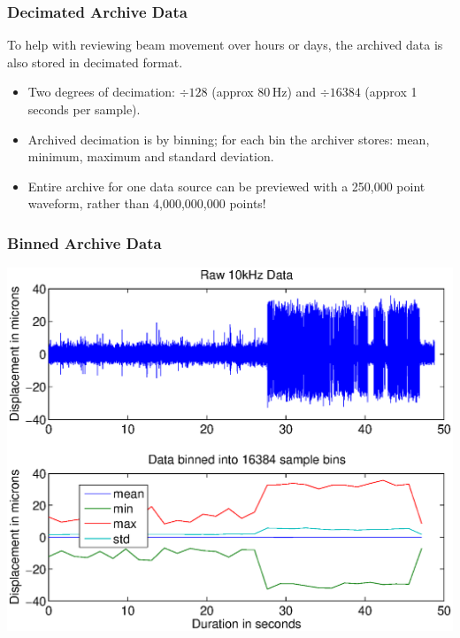 \documentclass{beamer}
\begin{document}
\begin{frame}\frametitle{Decimated Archive Data}

To help with reviewing beam movement over hours or days, the archived data is
also stored in decimated format.

\begin{itemize}

\item Two degrees of decimation: $\div 128$ (approx 80\,Hz) and $\div 16384$
(approx 1\textonehalf{} seconds per sample).

\item Archived decimation is by binning; for each bin the archiver stores: mean,
minimum, maximum and standard deviation.

\item Entire archive for one data source can be previewed with a 250,000 point
waveform, rather than 4,000,000,000 points!

\end{itemize}
\end{frame}



\begin{frame}\frametitle{Binned Archive Data}
\begin{center}
\includegraphics[width=.9\linewidth]{binning}
\end{center}
\end{frame}
\end{document}
